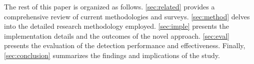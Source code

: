 

% 


The rest of this paper is organized as follows. \autoref{sec:related} provides a comprehensive review of current methodologies and surveys. \autoref{sec:method} delves into the detailed research methodology employed. \autoref{sec:imple} presents the implementation details and the outcomes of the novel approach. \autoref{sec:eval} presents the evaluation of the detection performance and effectiveness. Finally, \autoref{sec:conclusion} summarizes the findings and implications of the study. %


